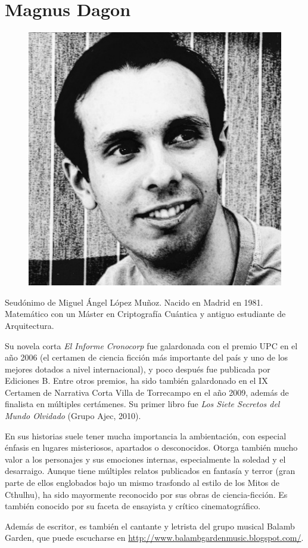 \section*{Magnus Dagon}
\begin{small}
	\begin{figure}
		\includegraphics[width=.4\textwidth]{images/magnus_dagon}
	\end{figure}

	Seudónimo de Miguel Ángel López Muñoz. Nacido en Madrid en 1981. Matemático con un Máster en Criptografía Cuántica y antiguo estudiante de Arquitectura. 

	Su novela corta \emph{El Informe Cronocorp} fue galardonada con el premio UPC en el año 2006 (el certamen de ciencia ficción más importante del país y uno de los mejores dotados a nivel internacional), y poco después fue publicada por Ediciones B. Entre otros premios, ha sido también galardonado en el IX Certamen de Narrativa Corta Villa de Torrecampo en el año 2009, además de finalista en múltiples certámenes. Su primer libro fue \emph{Los Siete Secretos del Mundo Olvidado} (Grupo Ajec, 2010).

	En sus historias suele tener mucha importancia la ambientación, con especial énfasis en lugares misteriosos, apartados o desconocidos. Otorga también mucho valor a los personajes y sus emociones internas, especialmente la soledad y el desarraigo. Aunque tiene múltiples relatos publicados en fantasía y terror (gran parte de ellos englobados bajo un mismo trasfondo al estilo de los Mitos de Cthulhu), ha sido mayormente reconocido por sus obras de ciencia-ficción. Es también conocido por su faceta de ensayista y crítico cinematográfico.

	Además de escritor, es también el cantante y letrista del grupo musical Balamb Garden, que puede escucharse en \url{http://www.balambgardenmusic.blogspot.com/}.
\end{small}


